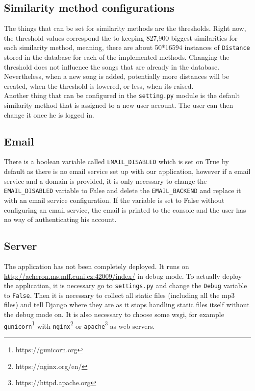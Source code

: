 \subsection{Similarity method configurations}
The things that can be set for similarity methods are the thresholds. Right now, the threshold values correspond the to keeping 827,900 biggest similarities for each similarity method, meaning, there are about 50*16594 instances of \texttt{Distance} stored in the database for each of the implemented methods. Changing the threshold does not influence the songs that are already in the database. Nevertheless, when a new song is added, potentially more distances will be created, when the threshold is lowered, or less, when its raised. \\
Another thing that can be configured in the \texttt{setting.py} module is the default similarity method that is assigned to a new user account. The user can then change it once he is logged in.

\subsection{Email}
There is a boolean variable called \texttt{EMAIL\_DISABLED} which is set on True by default as there is no email service set up with our application, however if a email service and a domain is provided, it is only necessary to change the \texttt{EMAIL\_DISABLED} variable to False and delete the \texttt{EMAIL\_BACKEND} and replace it with an email service configuration. If the variable is set to False without configuring an email service, the email is printed to the console and the user has no way of authenticating his account.

\subsection{Server}

The application has not been completely deployed. It runs on \url{http://acheron.ms.mff.cuni.cz:42009/index/} in debug mode. To actually deploy the application, it is necessary go to \texttt{settings.py} and change the \texttt{Debug} variable to \texttt{False}. Then it is necessary to collect all static files (including all the mp3 files) and tell Django where they are as it stops handling static files itself without the debug mode on. It is also necessary to choose some wsgi, for example \texttt{gunicorn}\footnote{https://gunicorn.org} with \texttt{nginx}\footnote{https://nginx.org/en/} or \texttt{apache}\footnote{https://httpd.apache.org} as web servers.





